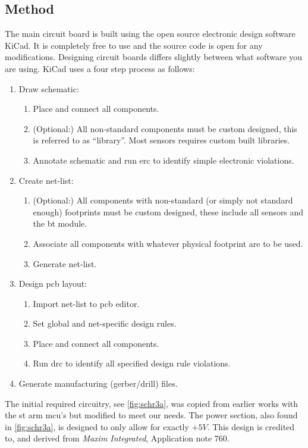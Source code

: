 \subsection{Method}
The main circuit board is built using the open source electronic design software KiCad\cite{kicad}. It is completely free to use and the source code is open for any modifications.
Designing circuit boards differs slightly between what software you are using. KiCad\cite{kicad} uses a four step process as follows:
\begin{enumerate}[noitemsep]
\item Draw schematic:
	\begin{enumerate}[noitemsep]
	\item Place and connect all components.
	\item (Optional:) All non-standard components must be custom designed, this is referred to as ``library''. Most sensors requires custom built libraries.
	\item Annotate schematic and run \gls{erc} to identify simple electronic violations.
	\end{enumerate}
\item Create net-list:
	\begin{enumerate}[noitemsep]
	\item (Optional:) All components with non-standard (or simply not standard enough) footprints must be custom designed, these include all sensors and the \gls{bt} module.
	\item Associate all components with whatever physical footprint are to be used.
	\item Generate net-list.
	\end{enumerate}
\item Design \gls{pcb} layout:
	\begin{enumerate}[noitemsep]
	\item Import net-list to \gls{pcb} editor.
	\item Set global and net-specific design rules.
	\item Place and connect all components.
	\item Run \gls{drc} to identify all specified design rule violations.
	\end{enumerate}
\item Generate manufacturing (gerber/drill) files.
\end{enumerate}
The initial required circuitry, see \autoref{fig:schr3a}, was copied from earlier works with the \gls{st} \gls{arm} \gls{mcu}'s but modified to meet our needs. The power section, also found in \autoref{fig:schr3a}, is designed to only allow for exactly $+5V$. This design is credited to, and derived from \emph{Maxim Integrated}, Application note 760\cite{overprotection}.

